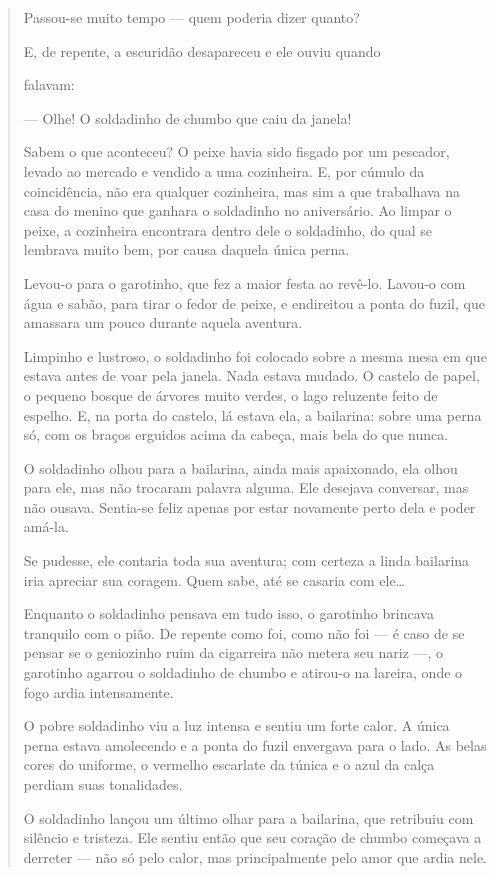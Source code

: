 \begin{escolha}
\begin{escolha}
{\begin{escolha}
\begin{quote}
Passou-se muito tempo --- quem poderia dizer quanto?

E, de repente, a escuridão desapareceu e ele ouviu quando

falavam:

--- Olhe! O soldadinho de chumbo que caiu da janela!

Sabem o que aconteceu? O peixe havia sido fisgado por um pescador,
levado ao mercado e vendido a uma cozinheira. E, por cúmulo da
coincidência, não era qualquer cozinheira, mas sim a que trabalhava na
casa do menino que ganhara o soldadinho no aniversário. Ao limpar o
peixe, a cozinheira encontrara dentro dele o soldadinho, do qual se
lembrava muito bem, por causa daquela única perna.

Levou-o para o garotinho, que fez a maior festa ao revê-lo. Lavou-o com
água e sabão, para tirar o fedor de peixe, e endireitou a ponta do
fuzil, que amassara um pouco durante aquela aventura.

Limpinho e lustroso, o soldadinho foi colocado sobre a mesma mesa em que
estava antes de voar pela janela. Nada estava mudado. O castelo de
papel, o pequeno bosque de árvores muito verdes, o lago reluzente feito
de espelho. E, na porta do castelo, lá estava ela, a bailarina: sobre
uma perna só, com os braços erguidos acima da cabeça, mais bela do que
nunca.

O soldadinho olhou para a bailarina, ainda mais apaixonado, ela olhou
para ele, mas não trocaram palavra alguma. Ele desejava conversar, mas
não ousava. Sentia-se feliz apenas por estar novamente perto dela e
poder amá-la.

Se pudesse, ele contaria toda sua aventura; com certeza a linda
bailarina iria apreciar sua coragem. Quem sabe, até se casaria com
ele\ldots{}

Enquanto o soldadinho pensava em tudo isso, o garotinho brincava
tranquilo com o pião. De repente como foi, como não foi --- é caso de se
pensar se o geniozinho ruim da cigarreira não metera seu nariz ---, o
garotinho agarrou o soldadinho de chumbo e atirou-o na lareira, onde o
fogo ardia intensamente.

O pobre soldadinho viu a luz intensa e sentiu um forte calor. A única
perna estava amolecendo e a ponta do fuzil envergava para o lado. As
belas cores do uniforme, o vermelho escarlate da túnica e o azul da
calça perdiam suas tonalidades.

O soldadinho lançou um último olhar para a bailarina, que retribuiu com
silêncio e tristeza. Ele sentiu então que seu coração de chumbo começava
a derreter --- não só pelo calor, mas principalmente pelo amor que ardia
nele.


\end{quote}
\end{escolha}}
\end{escolha}
\end{escolha}

